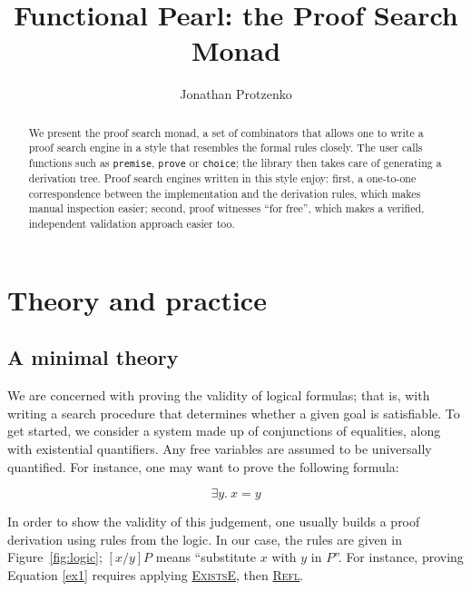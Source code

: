 \documentclass{easychair}
\def\li{\lstinline}
\let\TirName\textsc
\renewcommand{\DefTirName}[1]{\hyperlink{#1}{\TirName {#1}}}
\let\Rule\DefTirName
\newcommand{\fref}[1]{Figure~\ref{fig:#1}}
\begin{document}
\title{Functional Pearl: the Proof Search Monad}

\author{Jonathan Protzenko}

\maketitle

\begin{abstract}
  We present the proof search monad, a set of combinators that allows one to
  write a proof search engine in a style that resembles the formal rules
  closely. The user calls functions such as \li+premise+, \li+prove+ or
  \li+choice+; the library then takes care of generating a derivation tree.
  Proof search engines written in this style enjoy: first, a one-to-one
  correspondence between the implementation and the derivation rules, which
  makes manual inspection easier; second, proof witnesses ``for free'', which
  makes a verified, independent validation approach easier too.
\end{abstract}

\section{Theory and practice}
\label{sec:intro}

\subsection{A minimal theory}

We are concerned with proving the validity of logical formulas; that is, with
writing a search procedure that determines whether a given goal is satisfiable.
To get started, we consider a system made up of conjunctions of equalities,
along with existential quantifiers. Any free variables are assumed to be
universally quantified. For instance, one may want to prove the following
formula:

\begin{equation}
  \exists y.\ x = y
  \label{ex1}
\end{equation}

In order to show the validity of this judgement, one usually builds a proof
derivation using rules from the logic. In our case, the rules are given in
\fref{logic}; $[x/y]P$ means ``substitute $x$ with $y$ in $P$''. For
instance, proving Equation \ref{ex1} requires applying \Rule{ExistsE}, then
\Rule{Refl}.
\end{document}
